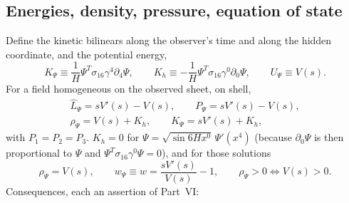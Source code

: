 \documentclass[11pt,a4paper]{article}
\newcommand{\Lhat}{\hat{L}}
\newcommand{\sig}{\sigma_{16}}
\begin{document}
\subsection{Energies, density, pressure, equation of state}

Define the kinetic bilinears along the observer's time and along the hidden coordinate, and the
potential energy,
\begin{equation}\label{eq:Kpsi}
  K_\Psi\equiv\frac1H\Psi^{T}\sig\gamma^4\partial_4\Psi,\qquad
  K_h\equiv-\frac1H\Psi^{T}\sig\gamma^0\partial_0\Psi,\qquad
  U_\Psi\equiv V(s).
\end{equation}
For a field homogeneous on the observed sheet, on shell,
\begin{equation}\label{eq:rhoPpsi}
\begin{gathered}
  \Lhat_\Psi=sV'(s)-V(s),\qquad P_\Psi=sV'(s)-V(s),\\
  \rho_\Psi=V(s)+K_h,\qquad K_\Psi=sV'(s)+K_h ,
\end{gathered}
\end{equation}
with $P_1=P_2=P_3$. $K_h=0$ for $\Psi=\sqrt{\sin 6Hx^0}\,\Psi'(x^4)$ (because $\partial_0\Psi$ is
then proportional to $\Psi$ and $\Psi^{T}\sig\gamma^0\Psi=0$), and for those solutions
\begin{equation}\label{eq:wpsi}
  \rho_\Psi=V(s),\qquad w_\Psi\equiv w=\frac{sV'(s)}{V(s)}-1,\qquad \rho_\Psi>0\iff V(s)>0 .
\end{equation}
Consequences, each an assertion of Part~VI:
\end{document}
